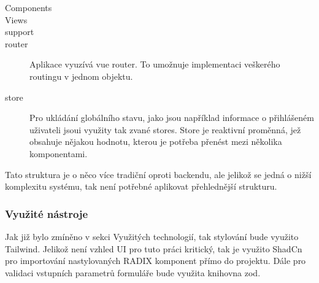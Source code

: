 \begin{description}
    \item[Components] 

    \item[Views]  

    \item[support] 

    \item[router] 
    Aplikace vyuzívá vue router. To umožnuje implementaci veškerého routingu v jednom objektu. 

    \item[store]
    Pro ukládání globálního stavu, jako jsou například informace o přihlášeném uživateli jsoui využity tak zvané stores. Store je reaktivní proměnná, jež obsahuje nějakou hodnotu, kterou je potřeba přenést mezi několika komponentami.
\end{description}

Tato struktura je o něco více tradiční oproti backendu, ale jelikož se jedná o nižší komplexitu systému, tak není potřebné aplikovat přehlednější strukturu.

\subsubsection{Využité nástroje}
Jak již bylo zmíněno v sekci Využitých technologií, tak stylování bude využito Tailwind. Jelikož není vzhled UI pro tuto práci kritický, tak je využito ShadCn pro importování nastylovaných RADIX komponent přímo do projektu. Dále pro validaci vstupních parametrů formuláře bude využita knihovna zod.


